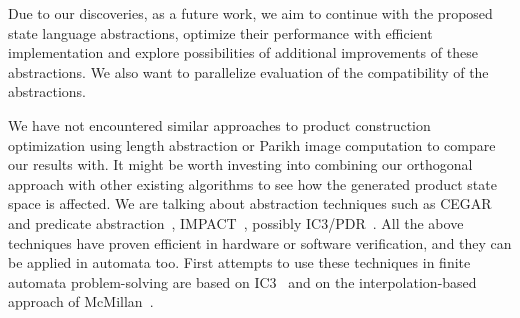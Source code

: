 Due to our discoveries, as a future work, we aim to continue with the proposed state language abstractions, optimize their performance with efficient implementation and explore possibilities of additional improvements of these abstractions. We also want to parallelize evaluation of the compatibility of the abstractions.

We have not encountered similar approaches to product construction optimization using length abstraction or Parikh image computation to compare our results with. It might be worth investing into combining our orthogonal approach with other existing algorithms to see how the generated product state space is affected. We are talking about abstraction techniques such as CEGAR~\cite{DBLP:conf/cav/ClarkeGJLV00} and predicate abstraction~\cite{DBLP:conf/cav/ColonU98, DBLP:conf/cav/GrafS97}, IMPACT~\cite{DBLP:conf/cav/McMillan06}, possibly IC3/PDR~\cite{DBLP:conf/sat/HoderB12, DBLP:conf/fmcad/BradleyM07}. All the above techniques have proven efficient in hardware or software verification, and they can be applied in automata too. First attempts to use these techniques in finite automata problem-solving are based on IC3~\cite{DBLP:journals/pacmpl/HolikJLRV18, DBLP:conf/cav/WangTLYJ16, DBLP:journals/corr/abs-1708-09073} and on the interpolation-based approach of McMillan~\cite{DBLP:conf/tacas/AmlaM07, DBLP:conf/tacas/GangeNSSS13}.
